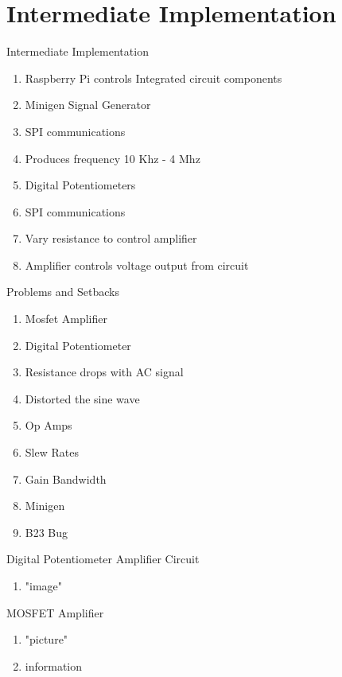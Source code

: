 \section{Intermediate Implementation}

\begin{frame}{Intermediate Implementation}
  \begin{enumerate}
    \item Raspberry Pi controls Integrated circuit components
    \item Minigen Signal Generator
    \item SPI communications
    \item Produces frequency 10 Khz - 4 Mhz
    \item Digital Potentiometers
    \item SPI communications
    \item Vary resistance to control amplifier
    \item Amplifier controls voltage output from circuit
  \end{enumerate}
\end{frame}

\begin{frame}{Problems and Setbacks}
  \begin{enumerate}
    \item Mosfet Amplifier
    \item Digital Potentiometer
    \item Resistance drops with AC signal
    \item Distorted the sine wave
    \item Op Amps
    \item Slew Rates
    \item Gain Bandwidth
    \item Minigen
    \item B23 Bug
  \end{enumerate}
\end{frame}

\begin{frame}{Digital Potentiometer Amplifier Circuit }
  \begin{enumerate}
    \item "image"
  \end{enumerate}
\end{frame}

\begin{frame}{MOSFET Amplifier}
  \begin{enumerate}
    \item "picture"
    \item information
  \end{enumerate}
\end{frame}

